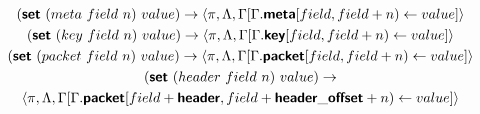 \begin{mdframed}
\begin{gather*}
  (\bm{\mathsf{{set}}} \ (meta \ field \ n) \ value)
  \rightarrow
  \langle \pi, \Lambda, \Gamma[\Gamma.\bm{\mathsf{{meta}}}[field, field + n) \leftarrow value] \rangle
  \\
  (\bm{\mathsf{{set}}} \ (key \ field \ n) \ value)
  \rightarrow
  \langle \pi, \Lambda, \Gamma[\Gamma.\bm{\mathsf{{key}}}[field, field + n) \leftarrow value] \rangle
  \\
  (\bm{\mathsf{{set}}} \ (packet \ field \ n) \ value)
  \rightarrow
  \langle \pi, \Lambda, \Gamma[\Gamma.\bm{\mathsf{{packet}}}[field, field + n) \leftarrow value] \rangle
  \\
  (\bm{\mathsf{{set}}} \ (header \ field \ n) \ value)
  \rightarrow \\
  \langle \pi, \Lambda, \Gamma[\Gamma.\bm{\mathsf{{packet}}}[field + \bm{\mathsf{{header}}},
      field + \bm{\mathsf{{header\_offset}}} + n) \leftarrow value] \rangle
  \\
\end{gather*}
\end{mdframed}
